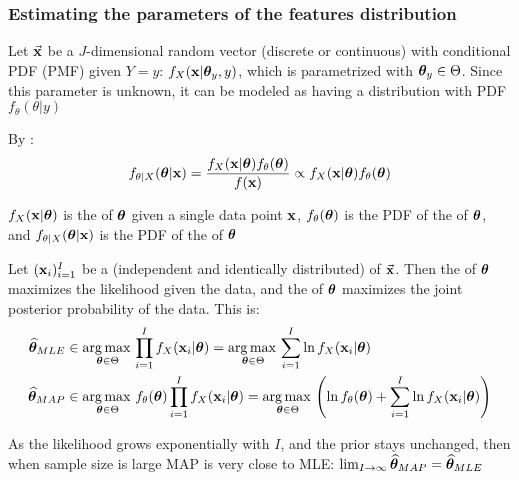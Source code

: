 \subsubsection{Estimating the parameters of the features distribution}

Let $\va{x}$ be a $J$-dimensional random vector (discrete or continuous) with conditional PDF (PMF) given $Y=y$: $f_X(\vb{x}|\vb*{\theta}_y,y)$, which is parametrized with $\vb*{\theta}_y\in\Theta$. Since this parameter is unknown, it can be modeled as having a distribution with PDF $f_\theta(\theta|y)$\medskip

By :
\begin{equation*}
    f_{\theta|X}(\vb*{\theta}|\vb{x})=\frac{f_{X}(\vb{x}|\vb*{\theta})f_\theta(\vb*{\theta})}{f(\vb{x})}\propto f_{X}(\vb{x}|\vb*{\theta})f_\theta(\vb*{\theta})
\end{equation*}

$f_{X}(\vb{x}|\vb*{\theta})$ is the  of $\vb*{\theta}$ given a single data point $\vb{x}$, $f_\theta(\vb*{\theta})$ is the PDF of the  of $\vb*{\theta}$, and  $f_{\theta|X}(\vb*{\theta}|\vb{x})$ is the PDF of the  of $\vb*{\theta}$\medskip

Let $(\vb{x}_i)_{i=1}^I$ be a  (independent and identically distributed) of $\va{x}$. Then the  of $\vb*{\theta}$ maximizes the likelihood given the data, and the  of $\vb*{\theta}$ maximizes the joint posterior probability of the data. This is:
\begin{align*}
    \widehat{\vb*{\theta}}_{MLE} &\in\operatorname*{arg\,max\,}\limits_{\vb*{\theta}\in\Theta}\prod_{i=1}^I f_{X}(\vb{x}_i|\vb*{\theta}) = \operatorname*{arg\,max\,}\limits_{\vb*{\theta}\in\Theta}\sum_{i=1}^I\ln f_{X}(\vb{x}_i|\vb*{\theta})\\
    \widehat{\vb*{\theta}}_{MAP} &\in\operatorname*{arg\,max\,}\limits_{\vb*{\theta}\in\Theta}f_\theta(\vb*{\theta})
    \prod_{i=1}^I f_{X}(\vb{x}_i|\vb*{\theta}) = \operatorname*{arg\,max\,}\limits_{\vb*{\theta}\in\Theta}\left(\ln f_\theta(\vb*{\theta})+\sum_{i=1}^I\ln f_{X}(\vb{x}_i|\vb*{\theta})\right)
\end{align*}

As the likelihood grows exponentially with $I$, and the prior stays unchanged, then when sample size is large MAP is very close to MLE: $\lim_{I\rightarrow\infty}\widehat{\vb*{\theta}}_{MAP}=\widehat{\vb*{\theta}}_{MLE}$ \medskip























